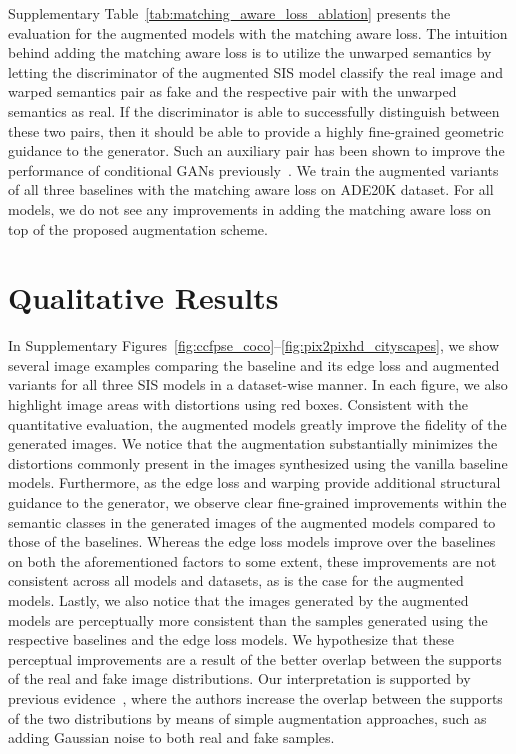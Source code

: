 \documentclass[final]{cvpr}
\newcommand\+{\mkern4mu}
\begin{document}
Supplementary Table~\ref{tab:matching_aware_loss_ablation} presents the evaluation for the augmented models with the matching aware loss. The intuition behind adding the matching aware loss is to utilize the unwarped semantics by letting the discriminator of the augmented SIS model classify the real image and warped semantics pair as fake and the respective pair with the unwarped semantics as real. If the discriminator is able to successfully distinguish between these two pairs, then it should be able to provide a highly fine-grained geometric guidance to the generator. Such an auxiliary pair has been shown to improve the performance of conditional GANs previously~\cite{ReedAYLSL16}. We train the augmented variants of all three baselines with the matching aware loss on ADE20K dataset. For all models, we do not see any improvements in adding the matching aware loss on top of the proposed augmentation scheme.
 \section{Qualitative Results}
\label{sec:qual_results}

In Supplementary Figures~\ref{fig:ccfpse_coco}--\ref{fig:pix2pixhd_cityscapes}, we show several image examples comparing the baseline and its edge loss and augmented variants for all three SIS models in a dataset-wise manner. In each figure, we also highlight image areas with distortions using red boxes. Consistent with the quantitative evaluation, the augmented models greatly improve the fidelity of the generated images. We notice that the augmentation substantially minimizes the distortions commonly present in the images synthesized using the vanilla baseline models. Furthermore, as the edge loss and warping provide additional structural guidance to the generator, we observe clear fine-grained improvements within the semantic classes in the generated images of the augmented models compared to those of the baselines. Whereas the edge loss models improve over the baselines on both the aforementioned factors to some extent, these improvements are not consistent across all models and datasets, as is the case for the augmented models. Lastly, we also notice that the images generated by the augmented models are perceptually more consistent than the samples generated using the respective baselines and the edge loss models. We hypothesize that these perceptual improvements are a result of the better overlap between the supports of the real and fake image distributions. Our interpretation is supported by previous evidence~\cite{Sonderby2016AmortisedMI}, where the authors increase the overlap between the supports of the two distributions by means of simple augmentation approaches, such as adding Gaussian noise to both real and fake samples. 
\end{document}
